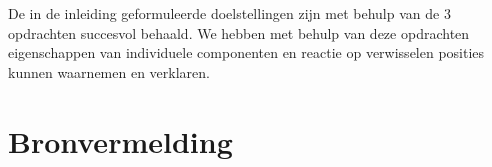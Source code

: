 \documentclass[12pt]{article}
\begin{document}
De in de inleiding geformuleerde doelstellingen zijn met behulp van de 3 opdrachten succesvol behaald. We hebben met behulp van deze opdrachten eigenschappen van individuele componenten en reactie op verwisselen posities kunnen waarnemen en verklaren.


\pagebreak






\nocite{*}
\section{Bronvermelding}




\pagebreak
\end{document}

